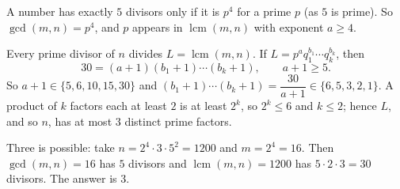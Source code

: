 A number has exactly $5$ divisors only if it is $p^4$ for a prime $p$ (as $5$ is prime). So $\gcd(m,n)=p^4$, and $p$ appears in $\operatorname{lcm}(m,n)$ with exponent $a\ge4$.

Every prime divisor of $n$ divides $L=\operatorname{lcm}(m,n)$. If $L=p^a q_1^{b_1}\cdots q_k^{b_k}$, then
\[
30=(a+1)(b_1+1)\cdots(b_k+1),\qquad a+1\ge5 .
\]
So $a+1\in\{5,6,10,15,30\}$ and $(b_1+1)\cdots(b_k+1)=\dfrac{30}{a+1}\in\{6,5,3,2,1\}$. A product of $k$ factors each at least $2$ is at least $2^k$, so $2^k\le6$ and $k\le2$; hence $L$, and so $n$, has at most $3$ distinct prime factors.

Three is possible: take $n=2^4\cdot3\cdot5^2=1200$ and $m=2^4=16$. Then $\gcd(m,n)=16$ has $5$ divisors and $\operatorname{lcm}(m,n)=1200$ has $5\cdot2\cdot3=30$ divisors. The answer is $\boxed{3}$.
